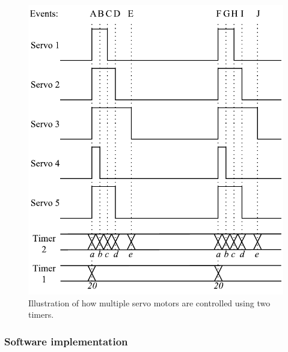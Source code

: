 \begin{figure}[H]
\centering
\includegraphics[scale = 1]{pics/Servo2.pdf}
\caption{Illustration of how multiple servo motors are controlled using two timers.}
\label{fig:Servo2}
\end{figure}

\subsubsection{Software implementation}